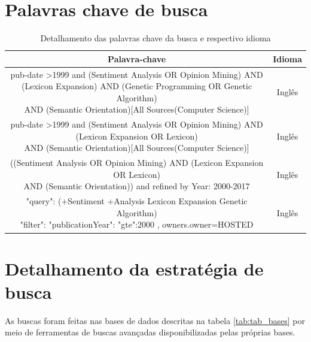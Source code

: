 \documentclass[a4paper,11pt]{article}
\begin{document}
\section{Palavras chave de busca}
\begin{table}[h]
\centering
\begin{tabular}{| c | c |}
\hline
\textbf{Palavra-chave} & \textbf{Idioma} \\
\hline
\makecell{pub-date \textgreater 1999 and (Sentiment Analysis OR Opinion Mining) AND \\ (Lexicon Expansion) AND (Genetic Programming OR Genetic Algorithm) \\ AND (Semantic Orientation)[All Sources(Computer Science)]} & Inglês \\
\hline
\makecell{pub-date \textgreater 1999 and (Sentiment Analysis OR Opinion Mining) AND \\ (Lexicon Expansion OR Lexicon) \\ AND (Semantic Orientation)[All Sources(Computer Science)]} & Inglês \\
\hline
\makecell{((Sentiment Analysis OR Opinion Mining) AND (Lexicon Expansion OR Lexicon) \\ AND (Semantic Orientation))  and refined by Year: 2000-2017} & Inglês \\
\hline
\makecell{"query": { (+Sentiment +Analysis Lexicon Expansion Genetic Algorithm) } \\ "filter": {"publicationYear":{ "gte":2000 }},
{owners.owner=HOSTED}} & Inglês \\
\hline
\end{tabular}
\caption{Detalhamento das palavras chave da busca e respectivo idioma}
\label{tab:tab_palchaves}
\end{table}
 
\section{Detalhamento da estratégia de busca}
As buscas foram feitas nas bases de dados descritas na tabela \ref{tab:tab_bases} por meio de ferramentas de buscas avançadas disponibilizadas pelas próprias bases.



\end{document}
